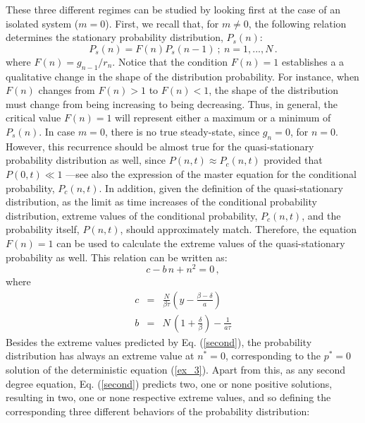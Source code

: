 \documentclass{article}
\begin{document}
These three different regimes can be studied by looking first at the case of an isolated system ($m=0$). First, we recall that, for $m \not= 0$, the following relation determines the stationary probability distribution, $P_s(n)$:
\begin{equation}
P_s(n) = F(n) P_s(n-1)\ ; \ n = 1,...,N\,. 
\label{balance_2}
\end{equation}  
where $F(n)=g_{n-1}/{r_n}$. Notice that the condition $F(n)=1$ establishes a a qualitative change in the shape of the distribution probability. For instance, when $F(n)$ changes from $F(n)>1$ to $F(n)<1$, the shape of the distribution must change from being increasing to being decreasing. Thus, in general, the critical value $F(n)=1$ will represent either a maximum or a minimum of $P_s(n)$. In case $m=0$, there is no true steady-state, since $g_n = 0$, for $n=0$. However, this recurrence should be almost true for the quasi-stationary probability distribution as well, since $P(n,t) \approx P_c(n,t)$ provided that $P(0,t) \ll 1$ ---see also the expression of the master equation for the conditional probability, $P_c(n,t)$. In addition, given the definition of the quasi-stationary distribution, as the limit as time increases of the conditional probability distribution, extreme values of the conditional probability, $P_c(n,t)$, and the probability itself, $P(n,t)$, should approximately match. Therefore, the equation $F(n)=1$ can be used to calculate the extreme values of the quasi-stationary probability as well. This relation can be written as: 
\begin{equation}
\label{second}
c - b\,n + n^2=0\,, 
\end{equation}
where
\begin{eqnarray}
\label{eq_c}
c & = & \frac{N}{\beta\tau}\left(y - \frac{\beta-\delta}{a}\right)\\
b & = & N\,\left(1+\frac{\delta}{\beta}\right)-\frac{1}{a\tau}
\label{eq_b}
\end{eqnarray}
Besides the extreme values predicted by Eq. (\ref{second}), the probability distribution has always an extreme value at $n^{*}=0$, corresponding to the $p^{*}=0$ solution of the deterministic equation (\ref{ex_3}). Apart from this, as any second degree equation, Eq. (\ref{second}) predicts two, one or none positive solutions, resulting in two, one or none respective extreme values, and so defining the corresponding three different behaviors of the probability distribution:
\end{document}

